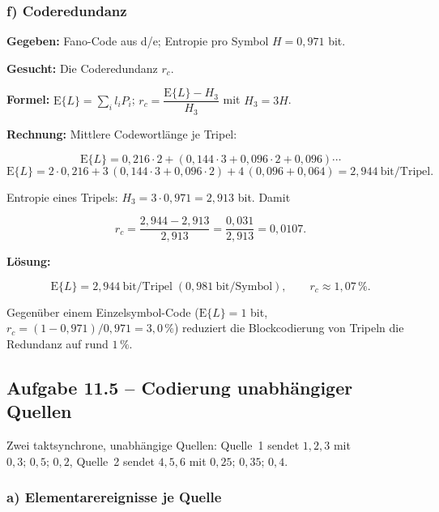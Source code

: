 \subsubsection*{f) Coderedundanz}

\begin{beispiel}

\textbf{Gegeben:} Fano-Code aus d/e; Entropie pro Symbol $H = 0{,}971$ bit.

\textbf{Gesucht:} Die Coderedundanz $r_c$.

\textbf{Formel:} $\mathrm{E}\{L\} = \sum_i l_i P_i$;
$r_c = \dfrac{\mathrm{E}\{L\} - H_3}{H_3}$ mit $H_3 = 3H$.

\textbf{Rechnung:} Mittlere Codewortlänge je Tripel:

$$
\mathrm{E}\{L\} = 0{,}216\cdot 2 + (0{,}144\cdot 3 + 0{,}096\cdot 2 + 0{,}096)\cdots
$$
$$
\mathrm{E}\{L\} = 2\cdot 0{,}216 + 3\,(0{,}144\cdot 3 + 0{,}096\cdot 2)
+ 4\,(0{,}096 + 0{,}064) = 2{,}944\ \text{bit/Tripel}.
$$

Entropie eines Tripels: $H_3 = 3\cdot 0{,}971 = 2{,}913$ bit. Damit

$$
r_c = \frac{2{,}944 - 2{,}913}{2{,}913} = \frac{0{,}031}{2{,}913} = 0{,}0107.
$$

\textbf{Lösung:}

$$
\boxed{\;\mathrm{E}\{L\} = 2{,}944\ \text{bit/Tripel}\;(0{,}981\ \text{bit/Symbol}),
\qquad r_c \approx 1{,}07\,\%.\;}
$$

Gegenüber einem Einzelsymbol-Code ($\mathrm{E}\{L\} = 1$ bit,
$r_c = (1-0{,}971)/0{,}971 = 3{,}0\,\%$) reduziert die Blockcodierung von
Tripeln die Redundanz auf rund $1\,\%$.

\end{beispiel}

\subsection*{Aufgabe 11.5 – Codierung unabhängiger Quellen}

Zwei taktsynchrone, unabhängige Quellen: Quelle~1 sendet $1,2,3$ mit
$0{,}3;\,0{,}5;\,0{,}2$, Quelle~2 sendet $4,5,6$ mit $0{,}25;\,0{,}35;\,0{,}4$.

\subsubsection*{a) Elementarereignisse je Quelle}

